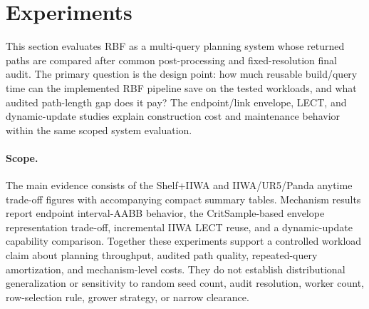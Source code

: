 \documentclass[journal]{IEEEtran}
\DeclareRobustCommand{\textsc}[1]{\textnormal{\MakeUppercase{#1}}}
\newcommand{\rbf}{\textsc{RBF}}
\begin{document}
\section{Experiments}\label{sec:exp}

This section evaluates \rbf{} as a multi-query planning system whose returned
paths are compared after common post-processing and fixed-resolution final
audit. The primary question is the design point:
how much reusable build/query time can the implemented \rbf{} pipeline save on
the tested workloads, and what audited path-length gap does it pay? The
endpoint/link envelope, LECT, and dynamic-update studies explain construction
cost and maintenance behavior within the same scoped system evaluation.

\paragraph{Scope.}
The main evidence consists of the Shelf+IIWA and IIWA/UR5/Panda anytime
trade-off figures with accompanying compact summary tables. Mechanism results
report endpoint interval-AABB behavior, the CritSample-based envelope
representation trade-off, incremental IIWA LECT reuse, and a dynamic-update
capability comparison. Together these experiments support a controlled workload
claim about planning throughput, audited path quality, repeated-query
amortization, and mechanism-level costs. They do not establish distributional
generalization or sensitivity to random seed count, audit resolution, worker
count, row-selection rule, grower strategy, or narrow clearance.
\end{document}
